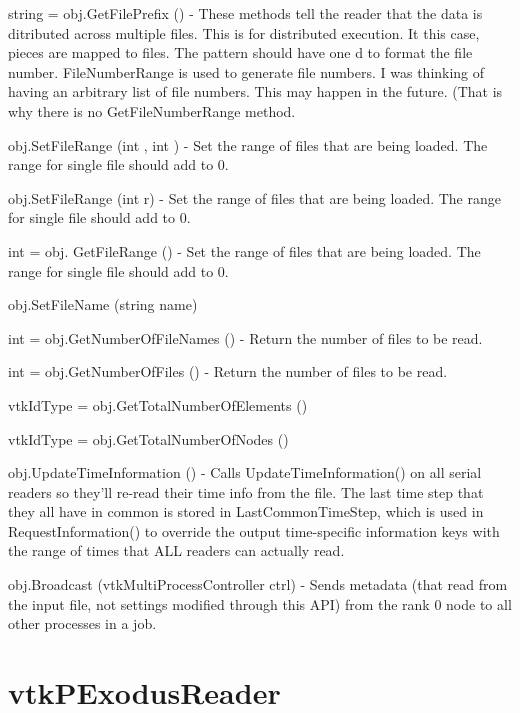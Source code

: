 \begin{DoxyItemize}
\item {\ttfamily string = obj.\-Get\-File\-Prefix ()} -\/ These methods tell the reader that the data is ditributed across multiple files. This is for distributed execution. It this case, pieces are mapped to files. The pattern should have one d to format the file number. File\-Number\-Range is used to generate file numbers. I was thinking of having an arbitrary list of file numbers. This may happen in the future. (That is why there is no Get\-File\-Number\-Range method.  
\item {\ttfamily obj.\-Set\-File\-Range (int , int )} -\/ Set the range of files that are being loaded. The range for single file should add to 0.  
\item {\ttfamily obj.\-Set\-File\-Range (int r)} -\/ Set the range of files that are being loaded. The range for single file should add to 0.  
\item {\ttfamily int = obj. Get\-File\-Range ()} -\/ Set the range of files that are being loaded. The range for single file should add to 0.  
\item {\ttfamily obj.\-Set\-File\-Name (string name)}  
\item {\ttfamily int = obj.\-Get\-Number\-Of\-File\-Names ()} -\/ Return the number of files to be read.  
\item {\ttfamily int = obj.\-Get\-Number\-Of\-Files ()} -\/ Return the number of files to be read.  
\item {\ttfamily vtk\-Id\-Type = obj.\-Get\-Total\-Number\-Of\-Elements ()}  
\item {\ttfamily vtk\-Id\-Type = obj.\-Get\-Total\-Number\-Of\-Nodes ()}  
\item {\ttfamily obj.\-Update\-Time\-Information ()} -\/ Calls Update\-Time\-Information() on all serial readers so they'll re-\/read their time info from the file. The last time step that they all have in common is stored in Last\-Common\-Time\-Step, which is used in Request\-Information() to override the output time-\/specific information keys with the range of times that A\-L\-L readers can actually read.  
\item {\ttfamily obj.\-Broadcast (vtk\-Multi\-Process\-Controller ctrl)} -\/ Sends metadata (that read from the input file, not settings modified through this A\-P\-I) from the rank 0 node to all other processes in a job.  
\end{DoxyItemize}\hypertarget{vtkhybrid_vtkpexodusreader}{}\section{vtk\-P\-Exodus\-Reader}\label{vtkhybrid_vtkpexodusreader}
